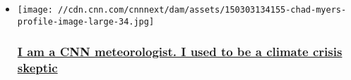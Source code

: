 \begin{itemize}
\item
  \href{/2019/09/04/weather/climate-change-skeptic/index.html}{}

  \texttt{[image: //cdn.cnn.com/cnnnext/dam/assets/150303134155-chad-myers-profile-image-large-34.jpg]}

  \hypertarget{i-am-a-cnn-meteorologist-i-used-to-be-a-climate-crisis-skeptic}{%
  \subsubsection{\texorpdfstring{\href{/2019/09/04/weather/climate-change-skeptic/index.html}{I
  am a CNN meteorologist. I used to be a climate crisis
  skeptic}}{I am a CNN meteorologist. I used to be a climate crisis skeptic}}\label{i-am-a-cnn-meteorologist-i-used-to-be-a-climate-crisis-skeptic}}
\end{itemize}


